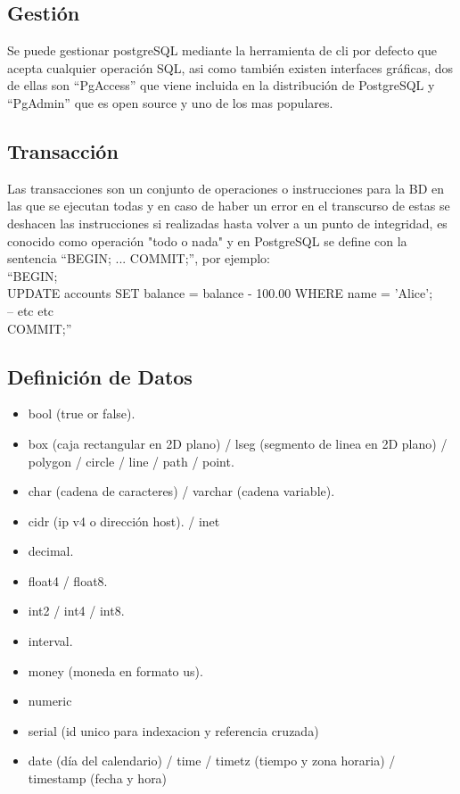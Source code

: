 \documentclass[spanish,12pt,letterpapper]{article}
\begin{document}
	\subsection{Gestión}
	Se puede gestionar postgreSQL mediante la herramienta de cli por defecto que acepta cualquier operación SQL, asi como también existen interfaces gráficas, dos de ellas son ``PgAccess'' que viene incluida en la distribución de PostgreSQL y ``PgAdmin'' que es open source y uno de los mas populares. 
	
	\subsection{Transacción}
	Las transacciones son un conjunto de operaciones o instrucciones para la BD en las que se ejecutan todas y en caso de haber un error en el transcurso de estas se deshacen las instrucciones si realizadas hasta volver a un punto de integridad, es conocido como operación "todo o nada" y  en PostgreSQL se define con la sentencia ``BEGIN; ... COMMIT;'', por ejemplo:\\
	
	``BEGIN;\\
UPDATE accounts SET balance = balance - 100.00
    WHERE name = 'Alice';\\
-- etc etc\\
COMMIT;'' \\
	   
	\subsection{Definición de Datos}
	   \begin{itemize}
	   \item bool (true or false).
	   \item box (caja rectangular en 2D plano) / lseg (segmento de linea en 2D plano) / polygon / circle / line / path / point.
	   \item char (cadena de caracteres) / varchar (cadena variable).
	   \item cidr (ip v4 o dirección host). / inet
	   \item decimal.
	   \item float4 / float8.
	   \item int2 / int4 / int8.
	   \item interval.
	   \item money (moneda en formato us).
	   \item numeric
	   \item serial (id unico para indexacion y referencia cruzada)
	   \item date (día del calendario) / time / timetz (tiempo y zona horaria) / timestamp (fecha y hora)   
	   \end{itemize}
	   
\end{document}
